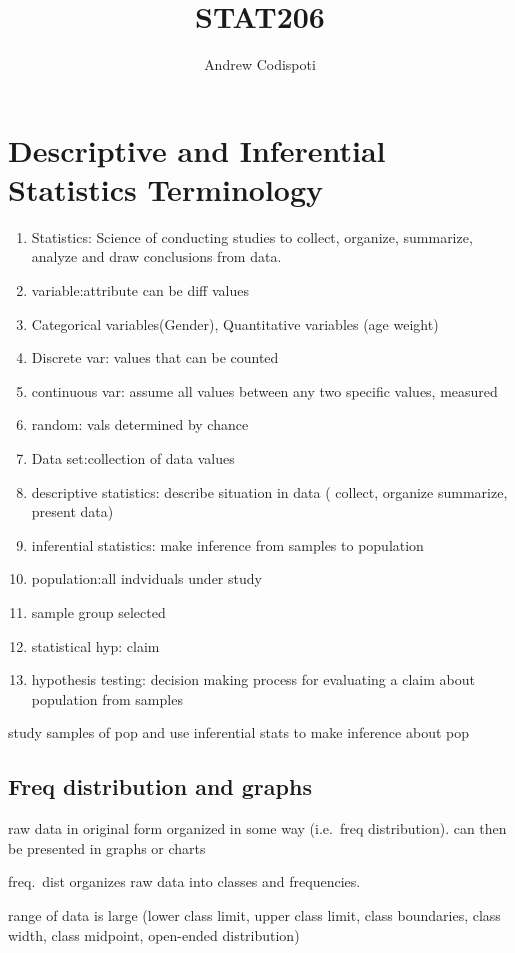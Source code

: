 \documentclass[11pt]{amsart}
\title{STAT206}
\author{Andrew Codispoti}
\begin{document}
\maketitle
\section{Descriptive and Inferential Statistics Terminology}
\begin{enumerate}
  \item Statistics: Science of conducting studies to collect, organize,
    summarize, analyze and draw conclusions from data.
  \item
    variable:attribute can be diff values
  \item Categorical variables(Gender), Quantitative variables (age weight)
  \item Discrete var: values that can be counted
  \item continuous var: assume all values between any two specific values,
    measured
  \item random: vals determined by chance
  \item Data set:collection of data values
  \item descriptive statistics: describe situation in data ( collect,
    organize summarize, present data)
  \item inferential statistics: make inference from samples to population
  \item population:all indviduals under study
  \item sample group selected
  \item statistical hyp: claim
  \item hypothesis testing: decision making process for evaluating a
    claim about population from samples
\end{enumerate}
\par study samples of pop and use inferential stats to make inference
about pop
\subsection{Freq distribution and graphs}
\par raw data in original form organized in some way  (i.e.\ freq
distribution). can then be presented in graphs or charts
\par freq.\ dist organizes raw data into classes and frequencies.
\par range of data is large (lower class limit, upper class limit, class
boundaries, class width, class midpoint, open-ended distribution)
\end{document}
